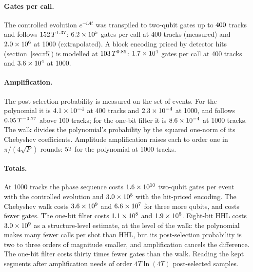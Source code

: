 \documentclass[11pt,a4paper]{article}
\begin{document}
\paragraph{Gates per call.}
The controlled evolution $e^{-iAt}$ was transpiled to two-qubit gates up to $400$ tracks
and follows $152\,T^{1.37}$: $6.2\times10^{5}$ gates per call at 400 tracks
(measured) and $2.0\times10^{6}$ at 1000 (extrapolated). A block encoding priced by detector hits
(section~\ref{sec:r5}) is modelled at $103\,T^{0.85}$: $1.7\times10^{4}$
gates per call at 400 tracks and $3.6\times10^{4}$ at 1000.

\paragraph{Amplification.}
The post-selection probability is measured on the set of events. For the polynomial it is
$4.1\times10^{-4}$ at 400 tracks and $2.3\times10^{-4}$ at 1000, and follows
$0.05\,T^{-0.77}$ above 100 tracks; for the one-bit filter it is
$8.6\times10^{-4}$ at 1000 tracks. The walk divides the polynomial's probability by the squared
one-norm of its Chebyshev coefficients. Amplitude amplification raises each to order one in
$\pi/(4\sqrt P)$ rounds: $52$ for the polynomial at 1000 tracks.

\paragraph{Totals.}
At 1000 tracks the phase sequence costs $1.6\times10^{10}$ two-qubit gates per event with the
controlled evolution and $3.0\times10^{8}$ with the hit-priced encoding. The Chebyshev walk
costs $3.6\times10^{9}$ and $6.6\times10^{7}$ for three more qubits, and costs fewer gates. The one-bit filter costs $1.1\times10^{8}$ and $1.9\times10^{6}$.
Eight-bit HHL costs $3.0\times10^{9}$ as a structure-level estimate, at the level of the walk:
the polynomial makes many fewer calls per shot than HHL, but its post-selection probability is two to
three orders of magnitude smaller, and amplification cancels the difference. The one-bit filter
costs thirty times fewer gates than the walk. Reading the kept segments after amplification needs of order
$4T\ln(4T)$ post-selected samples.
\end{document}
